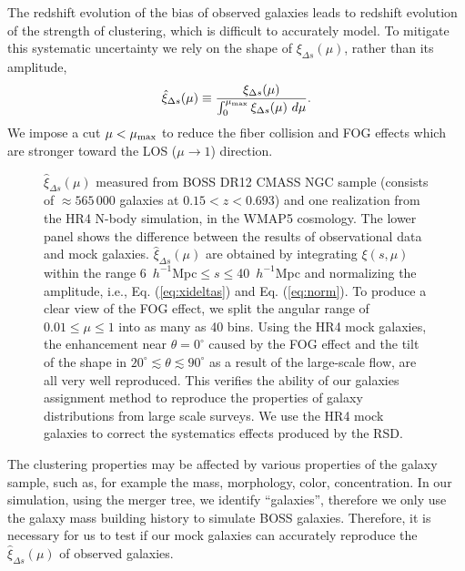 \documentclass[iop]{emulateapj}
\begin{document}
The redshift evolution of the bias of observed galaxies leads to redshift evolution of the strength of clustering,
which is difficult to accurately model.
To mitigate this systematic uncertainty we rely on the shape of $\xi_{\Delta s}(\mu)$, rather than its amplitude,
\begin{equation}\label{eq:norm}
 \hat\xi_{\Delta s}(\mu) \equiv \frac{\xi_{\Delta s}(\mu)}{\int_{0}^{\mu_{\rm max}}\xi_{\Delta s}(\mu)\ d\mu}.
\end{equation}
We impose a cut $\mu<\mu_{\rm max}$ to reduce the fiber collision and FOG effects which are stronger toward the LOS ($\mu\rightarrow1$) direction.

\begin{figure*}
   \centering{
   }
   \caption{\label{fig_datamock}
   $\hat\xi_{\Delta s}(\mu)$ measured from BOSS DR12 CMASS NGC sample 
    (consists of $\approx 565\,000$ galaxies at $0.15 < z < 0.693$)
    and one realization from the HR4 N-body simulation, in the WMAP5 cosmology.
   The lower panel shows the difference between the results of observational data and mock galaxies.
   $\hat\xi_{\Delta s}(\mu)$ are obtained by integrating $\xi (s,\mu)$ within the range {\rm 6\ $h^{-1}$Mpc}$\leq s\leq${\rm 40\ $h^{-1}$Mpc} 
      and normalizing the amplitude, 
    i.e., Eq. (\ref{eq:xideltas}) and Eq. (\ref{eq:norm}).
   To produce a clear view of the FOG effect, we split the angular range of $0.01\leq \mu \leq 1$ into as many as 40 bins.
   Using the HR4 mock galaxies, the enhancement near $\theta=0^\circ$ caused by the FOG effect
    and the tilt of the shape in $20^\circ\lesssim\theta\lesssim90^\circ$ 
    as a result of the large-scale flow,
    are all very well reproduced.
   This verifies the ability of our galaxies assignment method \citep{hong2016} 
    to reproduce the properties of galaxy distributions from large scale surveys.
   We use the HR4 mock galaxies to correct the systematics effects produced by the RSD.
   }
\end{figure*}


The clustering properties may be affected by various properties of the galaxy sample, 
such as, for example the mass, morphology, color, concentration. 
In our simulation, using the merger tree, 
we identify ``galaxies'', therefore we only use the galaxy mass building history to simulate BOSS galaxies. 
Therefore, it is necessary for us to test if our mock galaxies can accurately 
reproduce the $\hat\xi_{\Delta s}(\mu)$ of observed galaxies.
\end{document}
